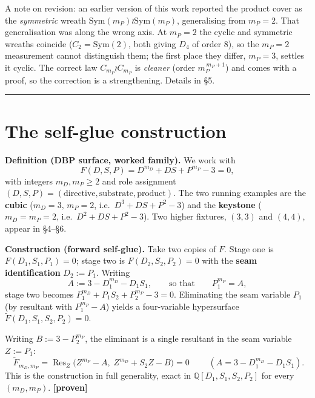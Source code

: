 \documentclass[11pt]{article}
\theoremstyle{plain}
\theoremstyle{definition}
\theoremstyle{remark}
\begin{document}
A note on revision: an earlier version of this work reported the product cover as the \emph{symmetric} wreath \(\mathrm{Sym}(m_P)\wr\mathrm{Sym}(m_P)\), generalising from \(m_P=2\). That generalisation was along the wrong axis. At \(m_P=2\) the cyclic and symmetric wreaths coincide (\(C_2 = \mathrm{Sym}(2)\), both giving \(D_4\) of order \(8\)), so the \(m_P=2\) measurement cannot distinguish them; the first place they differ, \(m_P=3\), settles it cyclic. The correct law \(C_{m_P}\wr C_{m_P}\) is \emph{cleaner} (order \(m_P^{\,m_P+1}\)) and comes with a proof, so the correction is a strengthening. Details in §5.

\begin{center}\rule{0.5\linewidth}{0.5pt}\end{center}

\hypertarget{the-self-glue-construction}{%
\section{The self-glue construction}\label{the-self-glue-construction}}

\textbf{Definition (DBP surface, worked family).} We work with \[
F(D,S,P) = D^{m_D} + DS + P^{m_P} - 3 = 0,
\] with integers \(m_D, m_P \ge 2\) and role assignment \((D,S,P) = (\text{directive}, \text{substrate}, \text{product})\). The two running examples are the \textbf{cubic} (\(m_D=3,\,m_P=2\), i.e.~\(D^3+DS+P^2-3\)) and the \textbf{keystone} (\(m_D=m_P=2\), i.e.~\(D^2+DS+P^2-3\)). Two higher fixtures, \((3,3)\) and \((4,4)\), appear in §4--§6.

\textbf{Construction (forward self-glue).} Take two copies of \(F\). Stage one is \(F(D_1,S_1,P_1)=0\); stage two is \(F(D_2,S_2,P_2)=0\) with the \textbf{seam identification} \(D_2 := P_1\). Writing \[
A := 3 - D_1^{m_D} - D_1 S_1, \qquad\text{so that}\qquad P_1^{m_P} = A,
\] stage two becomes \(P_1^{m_D} + P_1 S_2 + P_2^{m_P} - 3 = 0\). Eliminating the seam variable \(P_1\) (by resultant with \(P_1^{m_P} - A\)) yields a four-variable hypersurface \(\widetilde F(D_1,S_1,S_2,P_2)=0\).

Writing \(B := 3 - P_2^{m_P}\), the eliminant is a single resultant in the seam variable \(Z := P_1\): \[
\boxed{\;\widetilde F_{m_D,m_P} = \operatorname{Res}_Z\!\big(Z^{m_P}-A,\; Z^{m_D}+S_2 Z - B\big) = 0\;}\qquad (A = 3 - D_1^{m_D} - D_1 S_1).
\] This is the construction in full generality, exact in \(\mathbb Q[D_1,S_1,S_2,P_2]\) for every \((m_D,m_P)\). \textbf{{[}proven{]}}
\end{document}
